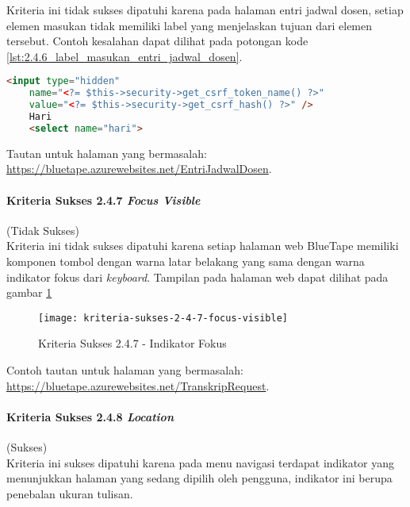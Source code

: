 Kriteria ini tidak sukses dipatuhi karena pada halaman entri jadwal dosen, setiap elemen masukan tidak memiliki label yang menjelaskan tujuan dari elemen tersebut. Contoh kesalahan dapat dilihat pada potongan kode \ref{lst:2.4.6_label_masukan_entri_jadwal_dosen}.

\begin{lstlisting}[frame=single, label={lst:2.4.6_label_masukan_entri_jadwal_dosen}, language=HTML, caption=Kriteria Sukses 2.4.6 - Tidak Terdapat Label pada Kolom Masukan di Halaman Entri Jadwal Dosen]
    <input type="hidden" 
    name="<?= $this->security->get_csrf_token_name() ?>"
    value="<?= $this->security->get_csrf_hash() ?>" />
    Hari
    <select name="hari">
\end{lstlisting}
Tautan untuk halaman yang bermasalah: \url{https://bluetape.azurewebsites.net/EntriJadwalDosen}.

\paragraph{Kriteria Sukses 2.4.7 \textit{Focus Visible}}
\label{par:kepatuhan_bluetape_kriteria_sukses_2.4.7}
(Tidak Sukses)\\

Kriteria ini tidak sukses dipatuhi karena setiap halaman web BlueTape memiliki komponen tombol dengan warna latar belakang yang sama dengan warna indikator fokus dari \textit{keyboard}. Tampilan pada halaman web dapat dilihat pada gambar \ref{fig:2.4.7_focus_visible}

\begin{figure}[H]
	\centering  
	\texttt{[image: kriteria-sukses-2-4-7-focus-visible]}  
    \caption[Kriteria Sukses 2.4.7 - Indikator Fokus]{Kriteria Sukses 2.4.7 - Indikator Fokus}
    \label{fig:2.4.7_focus_visible}  
\end{figure}
Contoh tautan untuk halaman yang bermasalah: \url{https://bluetape.azurewebsites.net/TranskripRequest}.

\paragraph{Kriteria Sukses 2.4.8 \textit{Location}}
\label{par:kepatuhan_bluetape_kriteria_sukses_2.4.8}
(Sukses)\\

Kriteria ini sukses dipatuhi karena pada menu navigasi terdapat indikator yang menunjukkan halaman yang sedang dipilih oleh pengguna, indikator ini berupa penebalan ukuran tulisan.

